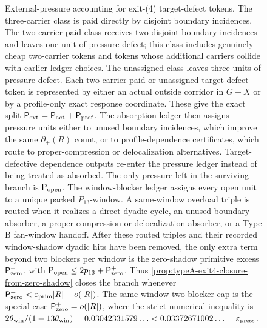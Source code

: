\documentclass[11pt]{article}
\newcommand{\defp}{\partial_+}
\begin{document}
\begin{figure}[t]
{%
}
\caption[External-pressure accounting for exit-(4) tokens]{External-pressure
accounting for exit-(4) target-defect tokens.  The three-carrier class is paid
directly by disjoint boundary incidences.  The two-carrier paid class receives
two disjoint boundary incidences and leaves one unit of pressure defect; this
class includes genuinely cheap two-carrier tokens and tokens whose additional
carriers collide with earlier ledger choices.  The unassigned class leaves
three units of pressure defect.  Each two-carrier paid or unassigned
target-defect token is represented by either an actual outside corridor in
\(G-X\) or by a profile-only exact response coordinate.  These give the exact
split
\(\mathsf P_{\rm ext}=\mathsf P_{\rm act}+\mathsf P_{\rm prof}\).  The
absorption ledger then assigns pressure units either to unused boundary
incidences, which improve the same \(\defp(R)\) count, or to profile-dependence
certificates, which route to proper-compression or delocalization alternatives.
Target-defective dependence outputs re-enter the pressure ledger instead of
being treated as absorbed.  The only pressure left in the surviving branch is
\(\mathsf P_{\rm open}\).  The window-blocker ledger assigns every open unit to
a unique packed \(P_{13}\)-window.  A same-window overload triple is routed
when it realizes a direct dyadic cycle, an unused boundary absorber, a
proper-compression or delocalization absorber, or a Type B fan-window handoff.
After these routed triples and their recorded window-shadow dyadic hits have
been removed, the only extra term beyond two blockers per window is the
zero-shadow primitive excess \(\mathsf P_{\rm zero}^{+}\), with
\(\mathsf P_{\rm open}\le2p_{13}+\mathsf P_{\rm zero}^{+}\).
Thus \cref{prop:typeA-exit4-closure-from-zero-shadow} closes the
branch whenever
\(\mathsf P_{\rm zero}^{+}<\varepsilon_{\rm prim}|R|-o(|R|)\).  The
same-window two-blocker cap is the special case
\(\mathsf P_{\rm zero}^{+}=o(|R|)\), where the strict numerical inequality is
\(2\theta_{\rm win}/(1-13\theta_{\rm win})
=0.03042331579\ldots<0.03372671002\ldots=\varepsilon_{\rm press}\).}
\label{fig:exit4-external-pressure-ledger}
\end{figure}
\end{document}
